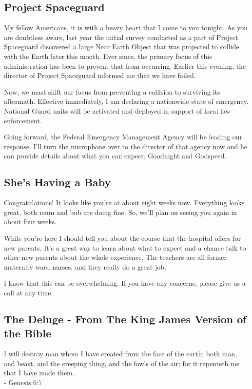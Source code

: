\documentclass[12pt, a5paper, parskip=half-]{scrartcl}
\begin{document}
\newpage

\subsection*{Project Spaceguard} \label{subsection:project-spaceguard}
My fellow Americans, it is with a heavy heart that I come to you tonight. 
As you are doubtless aware, last year the initial survey conducted as a part of Project Spaceguard discovered a large Near Earth Object that was projected to collide with the Earth later this month.
Ever since, the primary focus of this administration has been to prevent that from occurring. Earlier this evening, the director of Project Spaceguard informed me that we have failed.

Now, we must shift our focus from preventing a collision to surviving its aftermath.
Effective immediately, I am declaring a nationwide state of emergency. 
National Guard units will be activated and deployed in support of local law enforcement. 

Going forward, the Federal Emergency Management Agency will be leading our response.
I'll turn the microphone over to the director of that agency now and he can provide details about what you can expect.
Goodnight and Godspeed.


\subsection*{She's Having a Baby} \label{subsection:shes-having-a-baby}
Congratulations! It looks like you're at about eight weeks now.
Everything looks great, both mum and bub are doing fine. 
So, we'll plan on seeing you again in about four weeks.

While you're here I should tell you about the course that the hospital offers for new parents.
It's a great way to learn about what to expect and a chance talk to other new parents about the whole experience. 
The teachers are all former maternity ward nurses, and they really do a great job.

I know that this can be overwhelming.
If you have any concerns, please give us a call at any time. 

\newpage

\subsection*{The Deluge \setmainfont{URWClassico}- From The King James Version of the Bible} \label{subsection:the-deluge}
I will destroy man whom I have created from the face of the earth; both man, and beast, and the creeping thing, and the fowls of the air; for it repenteth me that I have made them.\\ 
\vspace{0.5ex}\hspace{8cm} - Genesis 6:7
\end{document}
